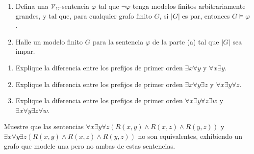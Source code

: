\message{ !name(main.tex)}\documentclass[12pt,a4paper]{book}
\newcommand{\VV}{\mathcal{V}}
\begin{document}
    \begin{ejercicio}
        \begin{enumerate}[label=(\alph*)]
            \item Defina una $\VV_{G}$-sentencia $\varphi$ tal que $\neg\varphi$ tenga modelos finitos arbitrariamente
            grandes, y tal que, para cualquier grafo finito $G$, si $|G|$ es par, entonces $G\models\varphi$.
            \item Halle un modelo finito $G$ para la sentencia $\varphi$ de la parte (a) tal que $|G|$ sea impar.
        \end{enumerate}
    \end{ejercicio}

    \begin{ejercicio}
        \begin{enumerate}[label=(\alph*)]
            \item Explique la diferencia entre los prefijos de primer orden $\exists x\forall y$ y $\forall x\exists y$.
            \item Explique la diferencia entre los prefijos de primer orden $\exists x\forall y\exists z$ y
            $\forall x\exists y\forall z$.
            \item Explique la diferencia entre los prefijos de primer orden $\forall x\exists y\forall z\exists w$ y
            $\exists x\forall y\exists z\forall w$.
        \end{enumerate}
    \end{ejercicio}

    \begin{ejercicio}
        Muestre que las sentencias $\forall x\exists y\forall z(R(x,y)\wedge R(x,z)\wedge R(y,z))$ y
        $\exists x\forall y\exists z(R(x,y)\wedge R(x,z)\wedge R(y,z))$ no son equivalentes, exhibiendo un grafo que modele
        una pero no ambas de estas sentencias.
    \end{ejercicio}
\end{document}
